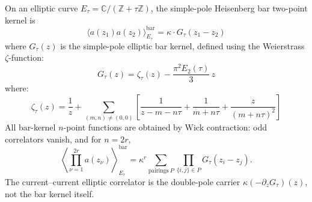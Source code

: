 \begin{theorem}\label{thm:heisenberg-genus-one-complete}
On an elliptic curve
$E_\tau = \mathbb{C}/(\mathbb{Z} + \tau\mathbb{Z})$, the
simple-pole Heisenberg bar two-point kernel is
\begin{equation}
\langle a(z_1) a(z_2) \rangle^{\mathrm{bar}}_{E_\tau}
= \kappa \cdot G_\tau(z_1 - z_2)
\end{equation}
where $G_\tau(z)$ is the simple-pole elliptic bar kernel, defined
using the Weierstrass $\zeta$-function:
\begin{equation}
G_\tau(z) = \zeta_\tau(z) - \frac{\pi^2 E_2(\tau)}{3}\, z
\end{equation}
where:
\begin{equation}
\zeta_\tau(z) = \frac{1}{z} + \sum_{(m,n) \neq (0,0)} \left[
\frac{1}{z - m - n\tau} + \frac{1}{m+n\tau} + \frac{z}{(m+n\tau)^2}
\right]
\end{equation}
All bar-kernel $n$-point functions are obtained by Wick contraction:
odd correlators vanish, and for $n=2r$,
\begin{equation}
\left\langle \prod_{\nu=1}^{2r}a(z_\nu)\right\rangle^{\mathrm{bar}}_{E_\tau}
=\kappa^r
\sum_{\mathrm{pairings}\ P}
\prod_{\{i,j\}\in P}G_\tau(z_i-z_j).
\end{equation}
The current--current elliptic correlator is the double-pole carrier
$\kappa(-\partial_zG_\tau)(z)$, not the bar kernel itself.
\end{theorem}

